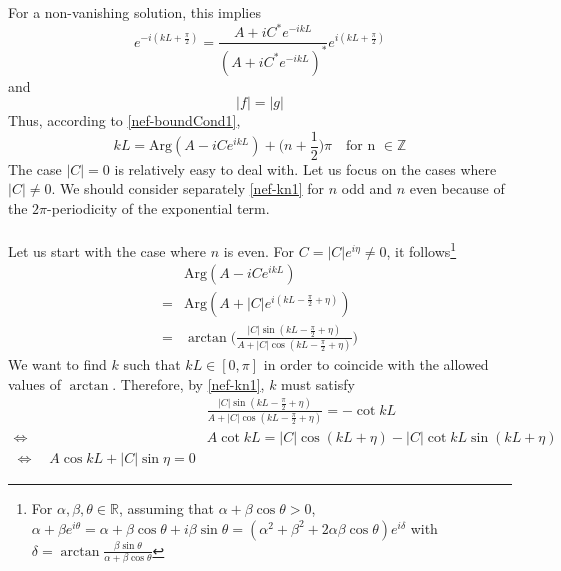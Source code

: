 For a non-vanishing solution, this implies
\begin{equation}\label{nef-boundCond1}
e^{-i(kL + \frac{\pi}{2})} = \frac{A + iC^* e^{-ikL}}{(A + iC^* e^{-ikL})^*} e^{i(kL + \frac{\pi}{2})}
\end{equation}
and 
\begin{equation}\label{nef-boundCond2}
| f | = | g |
\end{equation}
Thus, according to \cref{nef-boundCond1},
\begin{equation}\label{nef-kn1}
kL =  \textrm{Arg}(A - iC e^{ikL}) + \big(n+\frac{1}{2} \big)\pi   \quad \textrm{for n $\in \mathbb{Z}$}
\end{equation}
The case $|C| =0$ is relatively easy to deal with. Let us focus on the cases where $|C| \neq 0$. We should consider separately \cref{nef-kn1} for $n$ odd and $n$ even because of the $2\pi$-periodicity of the exponential term. \\\\
Let us start with the case where $n$ is even. 
For $C = |C| e^{i\eta} \neq 0 $, it follows\footnote{
For $\alpha, \beta, \theta \in \mathbb{R}$, assuming that $\alpha + \beta \cos \theta > 0$, $\alpha + \beta e^{i \theta} = \alpha + \beta \cos \theta + i\beta \sin \theta = (\alpha^2 + \beta^2 + 2\alpha \beta \cos \theta) e^{i \delta}$ with $\delta = \arctan \frac{\beta\sin\theta}{\alpha + \beta\cos\theta}$  
} 
\begin{equation}
\begin{split}
&\textrm{Arg}(A - iC e^{ikL}) \\
= &\textrm{Arg}(A + |C| e^{i(kL - \frac{\pi}{2} + \eta)}) \\
= & \arctan \bigg( \frac{|C| \sin(kL - \frac{\pi}{2} + \eta)}{A + | C| \cos(kL - \frac{\pi}{2} + \eta) }\bigg)
\end{split}
\end{equation}
We want to find $k$ such that $kL \in [0, \pi]$ in order to coincide with the allowed values of $\arctan$.
Therefore, by \cref{nef-kn1}, $k$ must satisfy
\begin{equation}\label{nef-arctan}
\begin{split}
& \frac{|C| \sin(kL - \frac{\pi}{2} + \eta)}{A + | C| \cos(kL - \frac{\pi}{2} + \eta) } =  - \cot kL  \\
\Leftrightarrow \quad & A \cot kL = |C| \cos(kL + \eta) - |C| \cot kL \sin(kL + \eta)  \\
%
\Leftrightarrow\quad
A \cos kL + |C| \sin\eta= 0
\end{split}
\end{equation}

